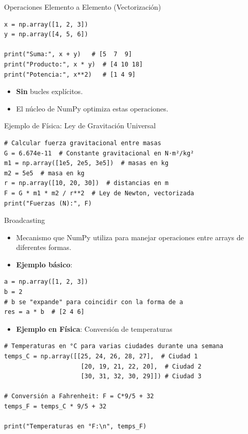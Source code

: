 \documentclass[10pt]{beamer}
\begin{document}
\begin{frame}[fragile]{Operaciones Elemento a Elemento (Vectorización)}
\begin{verbatim}
x = np.array([1, 2, 3])
y = np.array([4, 5, 6])

print("Suma:", x + y)   # [5  7  9]
print("Producto:", x * y)  # [4 10 18]
print("Potencia:", x**2)   # [1 4 9]
\end{verbatim}
\begin{itemize}
  \item \textbf{Sin} bucles explícitos.
  \item El núcleo de NumPy optimiza estas operaciones.
\end{itemize}

\begin{block}{Ejemplo de Física: Ley de Gravitación Universal}
\begin{verbatim}
# Calcular fuerza gravitacional entre masas
G = 6.674e-11  # Constante gravitacional en N⋅m²/kg²
m1 = np.array([1e5, 2e5, 3e5])  # masas en kg
m2 = 5e5  # masa en kg
r = np.array([10, 20, 30])  # distancias en m
F = G * m1 * m2 / r**2  # Ley de Newton, vectorizada
print("Fuerzas (N):", F)
\end{verbatim}
\end{block}
\end{frame}


\begin{frame}[fragile]{Broadcasting}
  \begin{itemize}
    \item Mecanismo que NumPy utiliza para manejar operaciones entre arrays de diferentes formas.
    \item \textbf{Ejemplo básico}:
  \end{itemize}
\begin{verbatim}
a = np.array([1, 2, 3])
b = 2
# b se "expande" para coincidir con la forma de a
res = a * b  # [2 4 6]
\end{verbatim}
    \begin{itemize}
    \item \textbf{Ejemplo en Física}: Conversión de temperaturas
  \end{itemize}
\begin{verbatim}
# Temperaturas en °C para varias ciudades durante una semana
temps_C = np.array([[25, 24, 26, 28, 27],  # Ciudad 1
                     [20, 19, 21, 22, 20],  # Ciudad 2
                     [30, 31, 32, 30, 29]]) # Ciudad 3
                     
# Conversión a Fahrenheit: F = C*9/5 + 32
temps_F = temps_C * 9/5 + 32

print("Temperaturas en °F:\n", temps_F)
\end{verbatim}
\end{frame}
\end{document}
